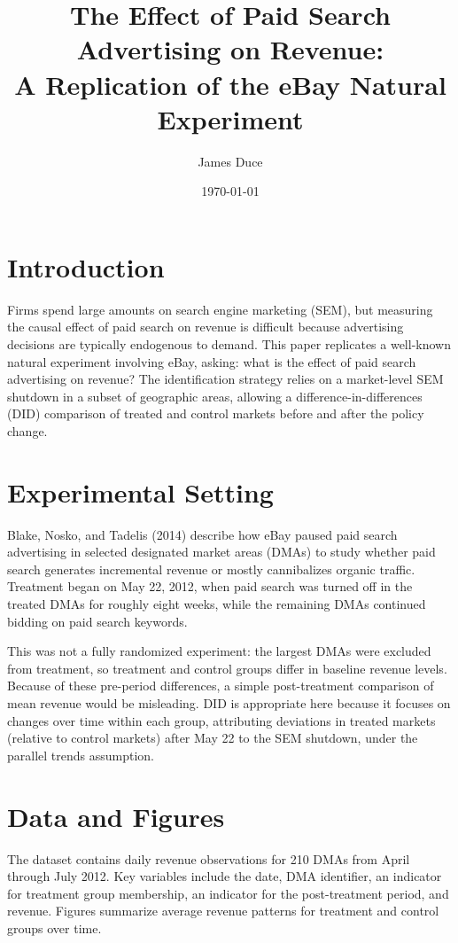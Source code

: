 \documentclass[12pt]{article}
\title{The Effect of Paid Search Advertising on Revenue: \\
A Replication of the eBay Natural Experiment}
\author{James Duce}
\date{\today}
\begin{document}
\maketitle

\section{Introduction}
Firms spend large amounts on search engine marketing (SEM), but measuring the causal effect of paid search on revenue is difficult because advertising decisions are typically endogenous to demand. This paper replicates a well-known natural experiment involving eBay, asking: what is the effect of paid search advertising on revenue? The identification strategy relies on a market-level SEM shutdown in a subset of geographic areas, allowing a difference-in-differences (DID) comparison of treated and control markets before and after the policy change.

\section{Experimental Setting}
Blake, Nosko, and Tadelis (2014) describe how eBay paused paid search advertising in selected designated market areas (DMAs) to study whether paid search generates incremental revenue or mostly cannibalizes organic traffic. Treatment began on May 22, 2012, when paid search was turned off in the treated DMAs for roughly eight weeks, while the remaining DMAs continued bidding on paid search keywords.

This was not a fully randomized experiment: the largest DMAs were excluded from treatment, so treatment and control groups differ in baseline revenue levels. Because of these pre-period differences, a simple post-treatment comparison of mean revenue would be misleading. DID is appropriate here because it focuses on changes over time within each group, attributing deviations in treated markets (relative to control markets) after May 22 to the SEM shutdown, under the parallel trends assumption.

\section{Data and Figures}
The dataset contains daily revenue observations for 210 DMAs from April through July 2012. Key variables include the date, DMA identifier, an indicator for treatment group membership, an indicator for the post-treatment period, and revenue. Figures summarize average revenue patterns for treatment and control groups over time.
\end{document}

